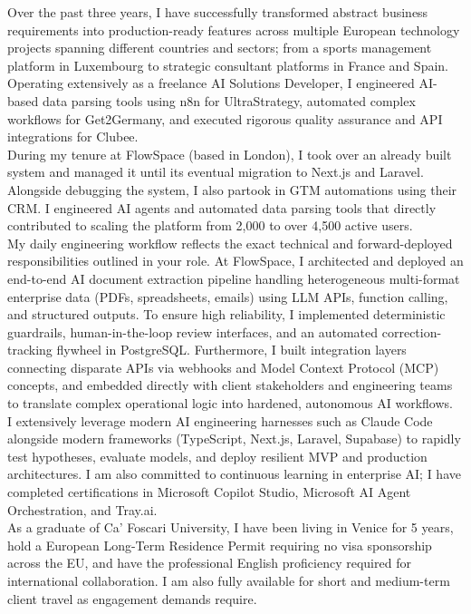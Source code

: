 \documentclass[a4paper,10pt]{article}
\begin{document}
Over the past three years, I have successfully transformed abstract business requirements into production-ready features across multiple European technology projects spanning different countries and sectors; from a sports management platform in Luxembourg to strategic consultant platforms in France and Spain.\\[6pt]

Operating extensively as a freelance AI Solutions Developer, I engineered AI-based data parsing tools using n8n for UltraStrategy, automated complex workflows for Get2Germany, and executed rigorous quality assurance and API integrations for Clubee.\\[6pt]

During my tenure at FlowSpace (based in London), I took over an already built system and managed it until its eventual migration to Next.js and Laravel. Alongside debugging the system, I also partook in GTM automations using their CRM. I engineered AI agents and automated data parsing tools that directly contributed to scaling the platform from 2,000 to over 4,500 active users.\\[6pt]

My daily engineering workflow reflects the exact technical and forward-deployed responsibilities outlined in your role. At FlowSpace, I architected and deployed an end-to-end AI document extraction pipeline handling heterogeneous multi-format enterprise data (PDFs, spreadsheets, emails) using LLM APIs, function calling, and structured outputs. To ensure high reliability, I implemented deterministic guardrails, human-in-the-loop review interfaces, and an automated correction-tracking flywheel in PostgreSQL. Furthermore, I built integration layers connecting disparate APIs via webhooks and Model Context Protocol (MCP) concepts, and embedded directly with client stakeholders and engineering teams to translate complex operational logic into hardened, autonomous AI workflows.\\[6pt]

I extensively leverage modern AI engineering harnesses such as Claude Code alongside modern frameworks (TypeScript, Next.js, Laravel, Supabase) to rapidly test hypotheses, evaluate models, and deploy resilient MVP and production architectures. I am also committed to continuous learning in enterprise AI; I have completed certifications in Microsoft Copilot Studio, Microsoft AI Agent Orchestration, and Tray.ai.\\[6pt]

As a graduate of Ca' Foscari University, I have been living in Venice for 5 years, hold a European Long-Term Residence Permit requiring no visa sponsorship across the EU, and have the professional English proficiency required for international collaboration. I am also fully available for short and medium-term client travel as engagement demands require.\\[6pt]
\end{document}
